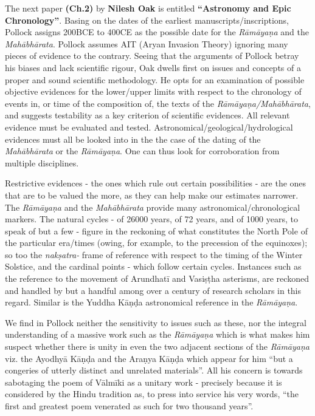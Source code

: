 The next paper \textbf{(Ch.2)} by \textbf{Nilesh Oak} is entitled \textbf{“Astronomy and Epic Chronology”}. Basing on the dates of the earliest manuscripts/inscriptions, Pollock assigns 200BCE to 400CE as the possible date for the \textit{Rāmāyaṇa} and the \textit{Mahābhārata}. Pollock assumes AIT (Aryan Invasion Theory) ignoring many pieces of evidence to the contrary. Seeing that the arguments of Pollock betray his biases and lack scientific rigour, Oak dwells first on issues and concepts of a proper and sound scientific methodology. He opts for an examination of possible objective evidences for the lower/upper limits with respect to the chronology of events in, or time of the composition of, the texts of the \textit{Rāmāyaṇa/Mahābhārata}, and suggests testability as a key criterion of scientific evidences. All relevant evidence must be evaluated and tested. Astronomical/geological/hydrological evidences must all be looked into in the the case of the dating of the \textit{Mahābhārata} or the \textit{Rāmāyaṇa}. One can thus look for corroboration from multiple disciplines.

Restrictive evidences - the ones which rule out certain possibilities - are the ones that are to be valued the more, as they can help make our estimates narrower. The \textit{Rāmāyaṇa} and the \textit{Mahābhārata} provide many astronomical/chronological markers. The natural cycles - of 26000 years, of 72 years, and of 1000 years, to speak of but a few - figure in the reckoning of what constitutes the North Pole of the particular era/times (owing, for example, to the precession of the equinoxes); so too the \textit{nakṣatra-} frame of reference with respect to the timing of the Winter Solstice, and the cardinal points - which follow certain cycles. Instances such as the reference to the movement of Arundhatī and Vasiṣṭha asterisms, are reckoned and handled by but a handful among over a century of research scholars in this regard. Similar is the Yuddha Kāṇḍa astronomical reference in the \textit{Rāmāyaṇa}.

We find in Pollock neither the sensitivity to issues such as these, nor the integral understanding of a massive work such as the \textit{Rāmāyaṇa} which is what makes him suspect whether there is unity in even the two adjacent sections of the \textit{Rāmāyaṇa} viz. the Ayodhyā Kāṇḍa and the Araṇya Kāṇḍa which appear for him “but a congeries of utterly distinct and unrelated materials”. All his concern is towards sabotaging the poem of Vālmīki as a unitary work - precisely because it is considered by the Hindu tradition as, to press into service his very words, “the first and greatest poem venerated as such for two thousand years”.

